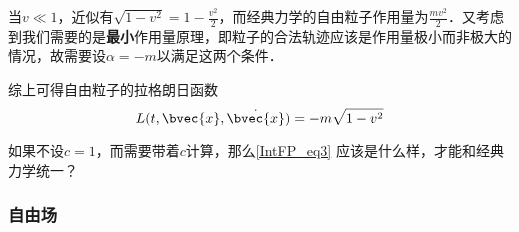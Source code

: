 当$v\ll 1$，近似有$\sqrt{1-v^2}=1-\frac{v^2}{2}$，而经典力学的自由粒子作用量为$\frac{mv^2}{2}$．又考虑到我们需要的是\textbf{最小}作用量原理，即粒子的合法轨迹应该是作用量极小而非极大的情况，故需要设$\alpha=-m$以满足这两个条件．

综上可得自由粒子的拉格朗日函数
\begin{equation}\label{IntFP_eq3}
L(t, \bvec{x}, \dot{\bvec{x}}) = -m\sqrt{1-v^2}
\end{equation}

\begin{exercise}{}
如果不设$c=1$，而需要带着$c$计算，那么\autoref{IntFP_eq3} 应该是什么样，才能和经典力学统一？
\end{exercise}


\subsubsection{自由场}















